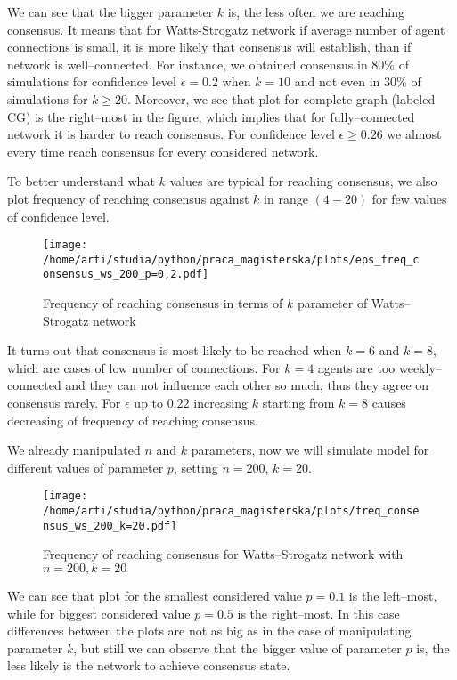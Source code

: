 \documentclass{article}
\begin{document}
We can see that the bigger parameter $k$ is, the less often we are reaching consensus. It means that for Watts-Strogatz network if average number of agent connections is small, it is more likely that consensus will establish, than if network is well--connected. For instance, we obtained consensus in 80\% of simulations for confidence level $\epsilon=0.2$ when $k=10$ and not even in 30\% of simulations for $k\geq20$.
\indent
Moreover, we see that plot for complete graph (labeled CG) is the right--most in the figure, which implies that for fully--connected network it is harder to reach consensus. For confidence level $\epsilon\geq0.26$ we almost every time reach consensus for every considered network.

\indent


To better understand what $k$ values are typical for reaching consensus, we also plot frequency of reaching consensus against $k$ in range $(4-20)$ for few values of confidence level.

\begin{figure}[H]
		\centering
		\texttt{[image: /home/arti/studia/python/praca\_magisterska/plots/eps\_freq\_consensus\_ws\_200\_p=0,2.pdf]}
		\caption{Frequency of reaching consensus in terms of $k$ parameter of Watts--Strogatz network}
		\label{freq_ws_eps}
\end{figure}

It turns out that consensus is most likely to be reached when $k=6$ and $k=8$, which are cases of low number of connections. For $k=4$ agents are too weekly--connected and they can not influence each other so much, thus they agree on consensus rarely. For $\epsilon$ up to $0.22$ increasing $k$ starting from $k=8$ causes decreasing of frequency of reaching consensus.

\indent

We already manipulated $n$ and $k$ parameters, now we will simulate model for different values of parameter $p$, setting $n=200$, $k=20$.

\begin{figure}[H]
		\centering
		\texttt{[image: /home/arti/studia/python/praca\_magisterska/plots/freq\_consensus\_ws\_200\_k=20.pdf]}
		\caption{Frequency of reaching consensus for Watts--Strogatz network with $n=200, k=20$}
\end{figure}

We can see that plot for the smallest considered value $p=0.1$ is the left--most, while for biggest considered value $p=0.5$ is the right--most. In this case differences between the plots are not as big as in the case of manipulating parameter $k$, but still we can observe that the bigger value of parameter $p$ is, the less likely is the network to achieve consensus state.
\end{document}
